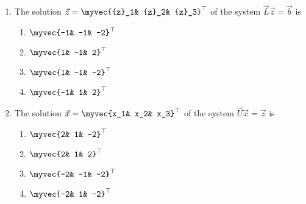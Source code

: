 \begin{enumerate}
\item The solution $\vec{z} = \myvec{{z}_1& {z}_2& {z}_3}^{\top}$ of the system $\vec{L}\vec{z} = \vec{b}$ is
\begin{multicols}{2}
\begin{enumerate}
   \item $\myvec{-1& -1& -2}^{\top}$
   \item $\myvec{1& -1& 2}^{\top}$
   \item $\myvec{1& -1& -2}^{\top}$
    \item $\myvec{-1& 1& 2}^{\top}$
\end{enumerate}
\end{multicols}
\item The solution $\vec{x} = \myvec{x_1& x_2& x_3}^{\top}$ of the system $\vec{U}\vec{x} = \vec{z}$ is
\begin{multicols}{2}
\begin{enumerate}
   \item $\myvec{2& 1& -2}^{\top}$
   \item $\myvec{2& 1& 2}^{\top}$
   \item $\myvec{-2& -1& -2}^{\top}$
    \item $\myvec{-2& 1& -2}^{\top}$
\end{enumerate}
\end{multicols}
\end{enumerate}
